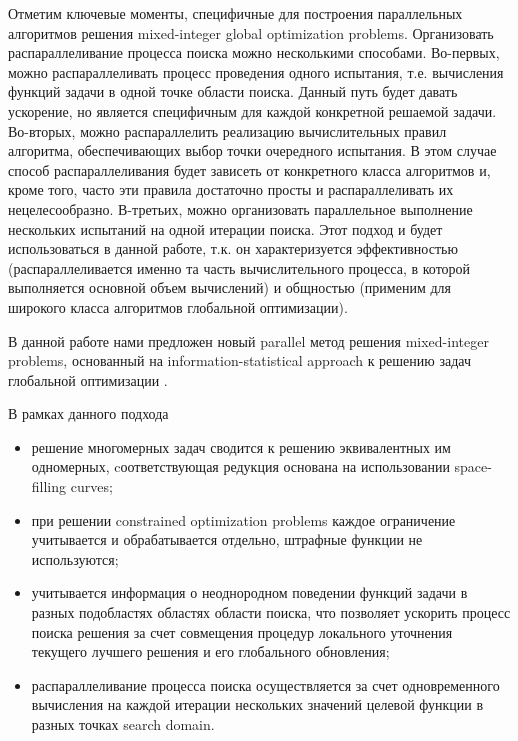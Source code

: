 \documentclass[
11pt,%
tightenlines,%
twoside,%
onecolumn,%
nofloats,%
nobibnotes,%
nofootinbib,%
superscriptaddress,%
noshowpacs,%
centertags]%
{revtex4}
\begin{document}
Отметим ключевые моменты, специфичные для построения параллельных алгоритмов решения mixed-integer global optimization problems. Организовать распараллеливание процесса поиска можно несколькими способами.
Во-первых, можно распараллеливать процесс проведения одного испытания, т.е. вычисления функций задачи в одной точке области поиска. Данный путь будет давать ускорение, но является специфичным для каждой конкретной решаемой задачи.
Во-вторых, можно распараллелить реализацию вычислительных правил алгоритма, обеспечивающих выбор точки очередного испытания. В этом случае способ распараллеливания будет зависеть от конкретного класса алгоритмов и, кроме того, часто эти правила достаточно просты и распараллеливать их нецелесообразно.
В-третьих, можно организовать параллельное выполнение нескольких испытаний на одной итерации поиска. Этот подход и будет использоваться в данной работе, т.к. он характеризуется эффективностью (распараллеливается именно та часть вычислительного процесса, в которой выполняется основной объем вычислений) и общностью (применим для широкого класса алгоритмов глобальной оптимизации).

В данной работе нами предложен новый parallel метод решения mixed-integer problems, основанный на information-statistical approach к решению задач глобальной оптимизации \cite{Strongin2000,Strongin2013}. 

В рамках данного подхода 
\begin{itemize}
	\item 
	решение многомерных задач сводится  к решению эквивалентных им одномерных, cоответствующая редукция основана на использовании space-filling curves;
	\item 
	при решении constrained optimization problems каждое ограничение учитывается и обрабатывается отдельно, штрафные функции не используются;
	\item
	учитывается информация о неоднородном поведении функций задачи в разных подобластях областях области поиска, что позволяет ускорить процесс поиска решения за счет совмещения процедур локального уточнения текущего лучшего решения и его глобального обновления;
	\item 
	распараллеливание процесса поиска осуществляется за счет одновременного вычисления на каждой итерации нескольких значений целевой функции в разных точках search domain.	
\end{itemize}
\end{document}

